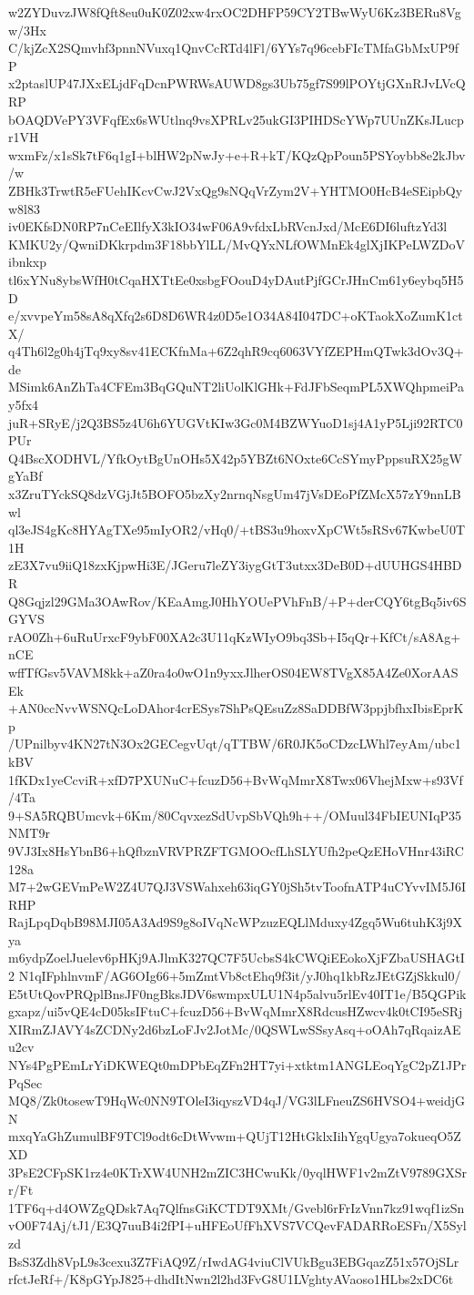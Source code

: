 w2ZYDuvzJW8fQft8eu0uK0Z02xw4rxOC2DHFP59CY2TBwWyU6Kz3BERu8Vgw/3Hx
C/kjZcX2SQmvhf3pnnNVuxq1QnvCcRTd4lFl/6YYs7q96cebFIcTMfaGbMxUP9fP
x2ptaslUP47JXxELjdFqDcnPWRWsAUWD8gs3Ub75gf7S99lPOYtjGXnRJvLVcQRP
bOAQDVePY3VFqfEx6sWUtlnq9vsXPRLv25ukGI3PIHDScYWp7UUnZKsJLucpr1VH
wxmFz/x1sSk7tF6q1gI+blHW2pNwJy+e+R+kT/KQzQpPoun5PSYoybb8e2kJbv/w
ZBHk3TrwtR5eFUehIKcvCwJ2VxQg9sNQqVrZym2V+YHTMO0HcB4eSEipbQyw8l83
iv0EKfsDN0RP7nCeEIlfyX3kIO34wF06A9vfdxLbRVcnJxd/McE6DI6luftzYd3l
KMKU2y/QwniDKkrpdm3F18bbYlLL/MvQYxNLfOWMnEk4glXjIKPeLWZDoVibnkxp
tl6xYNu8ybsWfH0tCqaHXTtEe0xsbgFOouD4yDAutPjfGCrJHnCm61y6eybq5H5D
e/xvvpeYm58sA8qXfq2s6D8D6WR4z0D5e1O34A84I047DC+oKTaokXoZumK1ctX/
q4Th6l2g0h4jTq9xy8sv41ECKfnMa+6Z2qhR9cq6063VYfZEPHmQTwk3dOv3Q+de
MSimk6AnZhTa4CFEm3BqGQuNT2liUolKlGHk+FdJFbSeqmPL5XWQhpmeiPay5fx4
juR+SRyE/j2Q3BS5z4U6h6YUGVtKIw3Gc0M4BZWYuoD1sj4A1yP5Lji92RTC0PUr
Q4BscXODHVL/YfkOytBgUnOHs5X42p5YBZt6NOxte6CcSYmyPppsuRX25gWgYaBf
x3ZruTYckSQ8dzVGjJt5BOFO5bzXy2nrnqNsgUm47jVsDEoPfZMcX57zY9nnLBwl
ql3eJS4gKc8HYAgTXe95mIyOR2/vHq0/+tBS3u9hoxvXpCWt5sRSv67KwbeU0T1H
zE3X7vu9iiQ18zxKjpwHi3E/JGeru7leZY3iygGtT3utxx3DeB0D+dUUHGS4HBDR
Q8Gqjzl29GMa3OAwRov/KEaAmgJ0HhYOUePVhFnB/+P+derCQY6tgBq5iv6SGYVS
rAO0Zh+6uRuUrxcF9ybF00XA2c3U11qKzWIyO9bq3Sb+I5qQr+KfCt/sA8Ag+nCE
wffTfGsv5VAVM8kk+aZ0ra4o0wO1n9yxxJlherOS04EW8TVgX85A4Ze0XorAASEk
+AN0ccNvvWSNQcLoDAhor4crESys7ShPsQEsuZz8SaDDBfW3ppjbfhxIbisEprKp
/UPnilbyv4KN27tN3Ox2GECegvUqt/qTTBW/6R0JK5oCDzcLWhl7eyAm/ubc1kBV
1fKDx1yeCcviR+xfD7PXUNuC+fcuzD56+BvWqMmrX8Twx06VhejMxw+s93Vf/4Ta
9+SA5RQBUmcvk+6Km/80CqvxezSdUvpSbVQh9h++/OMuul34FbIEUNIqP35NMT9r
9VJ3Ix8HsYbnB6+hQfbznVRVPRZFTGMOOcfLhSLYUfh2peQzEHoVHnr43iRC128a
M7+2wGEVmPeW2Z4U7QJ3VSWahxeh63iqGY0jSh5tvToofnATP4uCYvvIM5J6IRHP
RajLpqDqbB98MJI05A3Ad9S9g8oIVqNcWPzuzEQLlMduxy4Zgq5Wu6tuhK3j9Xya
m6ydpZoelJuelev6pHKj9AJlmK327QC7F5UcbsS4kCWQiEEokoXjFZbaUSHAGtI2
N1qIFphlnvmF/AG6OIg66+5mZmtVb8ctEhq9f3it/yJ0hq1kbRzJEtGZjSkkul0/
E5tUtQovPRQplBnsJF0ngBksJDV6swmpxULU1N4p5alvu5rlEv40IT1e/B5QGPik
gxapz/ui5vQE4cD05ksIFtuC+fcuzD56+BvWqMmrX8RdcusHZwcv4k0tCI95eSRj
XIRmZJAVY4sZCDNy2d6bzLoFJv2JotMc/0QSWLwSSsyAsq+oOAh7qRqaizAEu2cv
NYs4PgPEmLrYiDKWEQt0mDPbEqZFn2HT7yi+xtktm1ANGLEoqYgC2pZ1JPrPqSec
MQ8/Zk0tosewT9HqWc0NN9TOleI3iqyszVD4qJ/VG3lLFneuZS6HVSO4+weidjGN
mxqYaGhZumulBF9TCl9odt6cDtWvwm+QUjT12HtGklxIihYgqUgya7okueqO5ZXD
3PsE2CFpSK1rz4e0KTrXW4UNH2mZIC3HCwuKk/0yqlHWF1v2mZtV9789GXSrr/Ft
1TF6q+d4OWZgQDsk7Aq7QlfnsGiKCTDT9XMt/Gvebl6rFrIzVnn7kz91wqf1izSn
vO0F74Aj/tJ1/E3Q7uuB4i2fPI+uHFEoUfFhXVS7VCQevFADARRoESFn/X5Sylzd
BsS3Zdh8VpL9s3cexu3Z7FiAQ9Z/rIwdAG4viuClVUkBgu3EBGqazZ51x57OjSLr
rfctJeRf+/K8pGYpJ825+dhdItNwn2l2hd3FvG8U1LVghtyAVaoso1HLbs2xDC6t

